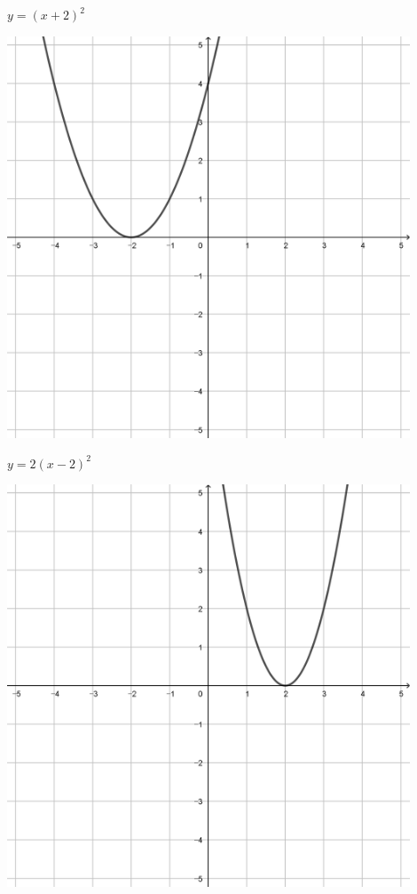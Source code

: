 \documentclass[a4paper]{oblivoir}
\begin{document}
\begin{minipage}{0.45\textwidth}\centering
\(y=(x+2)^2\)
\par\bigskip\includegraphics[width=0.9\textwidth]{img/8-5}
\end{minipage}
\begin{minipage}{0.45\textwidth}\centering
\(y=2(x-2)^2\)
\par\bigskip\includegraphics[width=0.9\textwidth]{img/8-6}
\end{minipage}\bigskip\bigskip\par
\end{document}
